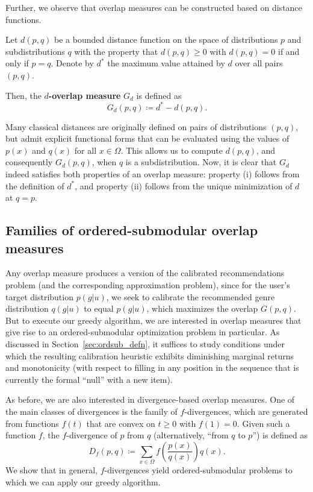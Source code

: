 Further, we observe that overlap measures can be constructed based on distance functions.

\begin{defn}
Let $d(p,q)$ be a bounded distance function on the space of distributions $p$ and subdistributions $q$ with the property that $d(p,q) \ge 0$ with $d(p,q) = 0$ if and only if $p=q$. Denote by $d^*$ the maximum value attained by $d$ over all pairs $(p,q)$.

Then, the \textbf{$d$-overlap measure} $G_d$ is defined as $$G_d(p,q) \coloneqq d^* - d(p,q).$$
\end{defn}

Many classical distances are originally defined on pairs of distributions $(p,q)$, but admit explicit functional forms that can be evaluated using the values of $p(x)$ and $q(x)$ for all $x \in \Omega$. This allows us to compute $d(p,q)$, and consequently $G_d(p,q)$, when $q$ is a subdistribution. Now, it is clear that $G_d$ indeed satisfies both properties of an overlap measure: property (i) follows from the definition of $d^*$, and property (ii) follows from the unique minimization of $d$ at $q=p$.

\subsection{Families of ordered-submodular overlap measures}
Any overlap measure produces a version of the calibrated recommendations problem (and the corresponding approximation problem), since for the user's target distribution $p(g|u)$, we seek to calibrate the recommended genre distribution $q(g|u)$ to equal $p(g|u)$, which maximizes the overlap $G(p,q)$. But to execute our greedy algorithm, we are interested in overlap measures that give rise to an ordered-submodular optimization problem in particular. As discussed in Section~\ref{sec:ordsub_defn}, it suffices to study conditions under which the resulting calibration heuristic exhibits diminishing marginal returns and monotonicity (with respect to filling in any position in the sequence that is currently the formal ``null'' with a new item). 

As before, we are also interested in divergence-based overlap measures. One of the main classes of divergences is the family of $f$-divergences, which are generated from functions $f(t)$ that are convex on $t \ge 0$ with $f(1) = 0$. Given such a function $f$, the $f$-divergence of $p$ from $q$ (alternatively, ``from $q$ to $p$'') is defined as $$D_f(p,q) \coloneqq \sum_{x\in \Omega} f\left( \frac{p(x)}{q(x)}\right) q(x).$$ We show that in general, $f$-divergences yield ordered-submodular problems to which we can apply our greedy algorithm.

